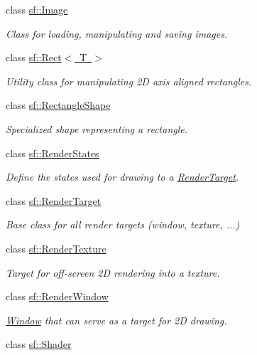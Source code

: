 \begin{DoxyCompactItemize}
class \mbox{\hyperlink{classsf_1_1_image}{sf\+::\+Image}}
\begin{DoxyCompactList}\small\item\em Class for loading, manipulating and saving images. \end{DoxyCompactList}\item 
class \mbox{\hyperlink{classsf_1_1_rect}{sf\+::\+Rect$<$ T $>$}}
\begin{DoxyCompactList}\small\item\em Utility class for manipulating 2D axis aligned rectangles. \end{DoxyCompactList}\item 
class \mbox{\hyperlink{classsf_1_1_rectangle_shape}{sf\+::\+Rectangle\+Shape}}
\begin{DoxyCompactList}\small\item\em Specialized shape representing a rectangle. \end{DoxyCompactList}\item 
class \mbox{\hyperlink{classsf_1_1_render_states}{sf\+::\+Render\+States}}
\begin{DoxyCompactList}\small\item\em Define the states used for drawing to a \mbox{\hyperlink{classsf_1_1_render_target}{Render\+Target}}. \end{DoxyCompactList}\item 
class \mbox{\hyperlink{classsf_1_1_render_target}{sf\+::\+Render\+Target}}
\begin{DoxyCompactList}\small\item\em Base class for all render targets (window, texture, ...) \end{DoxyCompactList}\item 
class \mbox{\hyperlink{classsf_1_1_render_texture}{sf\+::\+Render\+Texture}}
\begin{DoxyCompactList}\small\item\em Target for off-\/screen 2D rendering into a texture. \end{DoxyCompactList}\item 
class \mbox{\hyperlink{classsf_1_1_render_window}{sf\+::\+Render\+Window}}
\begin{DoxyCompactList}\small\item\em \mbox{\hyperlink{classsf_1_1_window}{Window}} that can serve as a target for 2D drawing. \end{DoxyCompactList}\item 
class \mbox{\hyperlink{classsf_1_1_shader}{sf\+::\+Shader}}

\end{DoxyCompactItemize}
